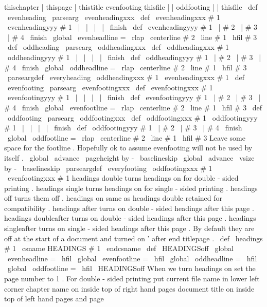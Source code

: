 thischapter
|
thispage
|
thistitle
%
evenfooting
thisfile
|
|
%
oddfooting
|
|
thisfile
\
def
\
evenheading
{
\
parsearg
\
evenheadingxxx
}
\
def
\
evenheadingxxx
#
1
{
\
evenheadingyyy
#
1
\
|
\
|
\
|
\
|
\
finish
}
\
def
\
evenheadingyyy
#
1
\
|
#
2
\
|
#
3
\
|
#
4
\
finish
{
%
\
global
\
evenheadline
=
{
\
rlap
{
\
centerline
{
#
2
}
}
\
line
{
#
1
\
hfil
#
3
}
}
}
\
def
\
oddheading
{
\
parsearg
\
oddheadingxxx
}
\
def
\
oddheadingxxx
#
1
{
\
oddheadingyyy
#
1
\
|
\
|
\
|
\
|
\
finish
}
\
def
\
oddheadingyyy
#
1
\
|
#
2
\
|
#
3
\
|
#
4
\
finish
{
%
\
global
\
oddheadline
=
{
\
rlap
{
\
centerline
{
#
2
}
}
\
line
{
#
1
\
hfil
#
3
}
}
}
\
parseargdef
\
everyheading
{
\
oddheadingxxx
{
#
1
}
\
evenheadingxxx
{
#
1
}
}
%
\
def
\
evenfooting
{
\
parsearg
\
evenfootingxxx
}
\
def
\
evenfootingxxx
#
1
{
\
evenfootingyyy
#
1
\
|
\
|
\
|
\
|
\
finish
}
\
def
\
evenfootingyyy
#
1
\
|
#
2
\
|
#
3
\
|
#
4
\
finish
{
%
\
global
\
evenfootline
=
{
\
rlap
{
\
centerline
{
#
2
}
}
\
line
{
#
1
\
hfil
#
3
}
}
}
\
def
\
oddfooting
{
\
parsearg
\
oddfootingxxx
}
\
def
\
oddfootingxxx
#
1
{
\
oddfootingyyy
#
1
\
|
\
|
\
|
\
|
\
finish
}
\
def
\
oddfootingyyy
#
1
\
|
#
2
\
|
#
3
\
|
#
4
\
finish
{
%
\
global
\
oddfootline
=
{
\
rlap
{
\
centerline
{
#
2
}
}
\
line
{
#
1
\
hfil
#
3
}
}
%
%
%
Leave
some
space
for
the
footline
.
Hopefully
ok
to
assume
%
evenfooting
will
not
be
used
by
itself
.
\
global
\
advance
\
pageheight
by
-
\
baselineskip
\
global
\
advance
\
vsize
by
-
\
baselineskip
}
\
parseargdef
\
everyfooting
{
\
oddfootingxxx
{
#
1
}
\
evenfootingxxx
{
#
1
}
}
%
headings
double
turns
headings
on
for
double
-
sided
printing
.
%
headings
single
turns
headings
on
for
single
-
sided
printing
.
%
headings
off
turns
them
off
.
%
headings
on
same
as
headings
double
retained
for
compatibility
.
%
headings
after
turns
on
double
-
sided
headings
after
this
page
.
%
headings
doubleafter
turns
on
double
-
sided
headings
after
this
page
.
%
headings
singleafter
turns
on
single
-
sided
headings
after
this
page
.
%
By
default
they
are
off
at
the
start
of
a
document
%
and
turned
on
'
after
end
titlepage
.
\
def
\
headings
#
1
{
\
csname
HEADINGS
#
1
\
endcsname
}
\
def
\
HEADINGSoff
{
%
\
global
\
evenheadline
=
{
\
hfil
}
\
global
\
evenfootline
=
{
\
hfil
}
\
global
\
oddheadline
=
{
\
hfil
}
\
global
\
oddfootline
=
{
\
hfil
}
}
\
HEADINGSoff
%
When
we
turn
headings
on
set
the
page
number
to
1
.
%
For
double
-
sided
printing
put
current
file
name
in
lower
left
corner
%
chapter
name
on
inside
top
of
right
hand
pages
document
%
title
on
inside
top
of
left
hand
pages
and
page
